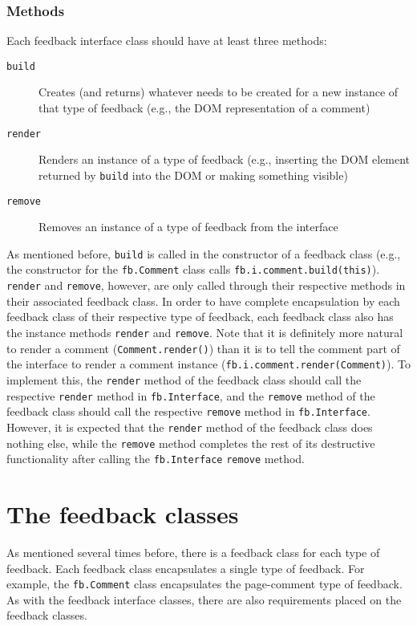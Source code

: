 \documentclass[letterpaper,12pt]{article}
\newcommand{\fb}[1]{\texttt{fb#1}}
\newcommand{\code}[1]{{\tt #1}}
\begin{document}
\subsubsection{Methods}
\label{sec:fb.Interface:interface classes:methods}
Each feedback interface class should have at least three methods:
\begin{description}
 \item[\code{build}] Creates (and returns) whatever needs to be created for a new instance of that type of feedback (e.g., the DOM representation of a comment)
 \item[\code{render}] Renders an instance of a type of feedback (e.g., inserting the DOM element returned by \code{build} into the DOM or making something visible)
 \item[\code{remove}] Removes an instance of a type of feedback from the interface
\end{description}
\noindent As mentioned before, \code{build} is called in the constructor of a feedback class (e.g., the constructor for the \fb{.Comment} class calls \fb{.i.comment.build(this)}).  \code{render} and \code{remove}, however, are only called through their respective methods in their associated feedback class.  In order to have complete encapsulation by each feedback class of their respective type of feedback, each feedback class also has the instance methods \code{render} and \code{remove}.  Note that it is definitely more natural to render a comment (\code{Comment.render()}) than it is to tell the comment part of the interface to render a comment instance (\fb{.i.comment.render(Comment)}).  To implement this, the \code{render} method of the feedback class should call the respective \code{render} method in \fb{.Interface}, and the \code{remove} method of the feedback class should call the respective \code{remove} method in \fb{.Interface}.  However, it is expected that the \code{render} method of the feedback class does nothing else, while the \code{remove} method completes the rest of its destructive functionality after calling the \fb{.Interface} \code{remove} method.

\section{The feedback classes}
\label{sec:feedback classes}
As mentioned several times before, there is a feedback class for each type of feedback.  Each feedback class encapsulates a single type of feedback.  For example, the \fb{.Comment} class encapsulates the page-comment type of feedback.  As with the feedback interface classes, there are also requirements placed on the feedback classes.
\end{document}
